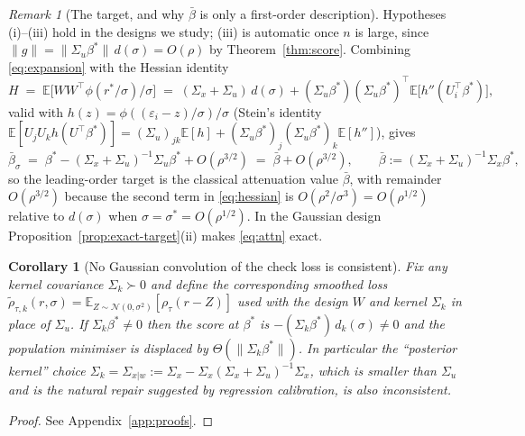 \documentclass[12pt,a4paper]{article}
\newtheorem{corollary}[theorem]{Corollary}
\theoremstyle{definition}
\theoremstyle{remark}
\newtheorem{remark}[theorem]{Remark}
\newcommand{\E}{\mathbb{E}}
\newcommand{\cN}{\mathcal{N}}
\newcommand{\norm}[1]{\|#1\|}
\newcommand{\betas}{\beta^*}
\newcommand{\bbar}{\bar{\beta}}
\newcommand{\Sxw}{\Sigma_{x|w}}
\begin{document}
\begin{remark}[The target, and why $\bbar$ is only a first-order description]
\label{rem:target}
Hypotheses (i)--(iii) hold in the designs we study; (iii) is automatic once $n$ is large,
since $\|g\|=\norm{\Sigma_u\betas}\,d(\sigma)=O(\rho)$ by Theorem~\ref{thm:score}.
Combining \eqref{eq:expansion} with the Hessian identity
\begin{equation}
H \;=\; \E\big[WW^\top\phi(r^*/\sigma)/\sigma\big]
\;=\; (\Sigma_x+\Sigma_u)\,d(\sigma) + (\Sigma_u\betas)(\Sigma_u\betas)^\top
      \E\big[h''(U_i^\top\betas)\big],
\label{eq:hessian}
\end{equation}
valid with $h(z)=\phi((\varepsilon_i-z)/\sigma)/\sigma$ (Stein's identity
$\E[U_jU_kh(U^\top\betas)]=(\Sigma_u)_{jk}\E[h]+(\Sigma_u\betas)_j(\Sigma_u\betas)_k\E[h'']$),
gives
\begin{equation}
\bbar_\sigma \;=\; \betas-(\Sigma_x+\Sigma_u)^{-1}\Sigma_u\betas+O(\rho^{3/2})
\;=\; \bbar + O(\rho^{3/2}),
\qquad
\bbar := (\Sigma_x+\Sigma_u)^{-1}\Sigma_x\betas ,
\label{eq:attn}
\end{equation}
so the leading-order target is the classical attenuation value $\bbar$, with remainder
$O(\rho^{3/2})$ because the second term in \eqref{eq:hessian} is
$O(\rho^2/\sigma^3)=O(\rho^{1/2})$ relative to $d(\sigma)$ when
$\sigma=\sigma^*=O(\rho^{1/2})$. In the Gaussian design Proposition~\ref{prop:exact-target}(ii)
makes \eqref{eq:attn} exact.
\end{remark}

\begin{corollary}[No Gaussian convolution of the check loss is consistent]
\label{cor:no-conv}
Fix any kernel covariance $\Sigma_k\succ0$ and define the corresponding smoothed loss
$\tilde{\rho}_{\tau,k}(r,\sigma) = \E_{Z\sim\cN(0,\sigma^2)}[\rho_\tau(r-Z)]$ used with the design $W$
and kernel $\Sigma_k$ in place of $\Sigma_u$. If $\Sigma_k\betas\neq0$ then the score at
$\betas$ is $-(\Sigma_k\betas)\,d_k(\sigma)\neq0$ and the population minimiser is
displaced by $\Theta(\norm{\Sigma_k\betas})$. In particular the ``posterior kernel''
choice $\Sigma_k = \Sxw := \Sigma_x-\Sigma_x(\Sigma_x+\Sigma_u)^{-1}\Sigma_x$, which is
smaller than $\Sigma_u$ and is the natural repair suggested by regression calibration, is
also inconsistent.
\end{corollary}

\begin{proof}
See Appendix~\ref{app:proofs}.
\end{proof}
\end{document}
